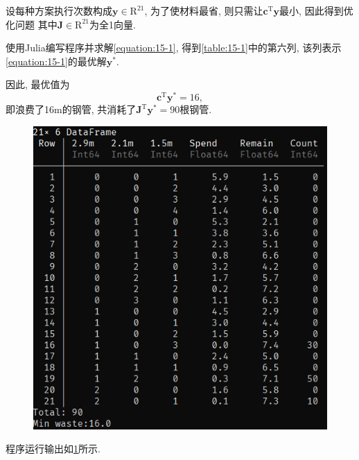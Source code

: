 设每种方案执行次数构成$\bm{y}\in\mathrm{R}^{21}$, 为了使材料最省, 则只需让$\bm{c}^\mathrm{T}\bm{y}$最小, 因此得到优化问题
其中$\bm{J}\in\mathrm{R}^{21}$为全1向量.

使用Julia编写程序并求解\cref{equation:15-1}, 得到\cref{table:15-1}中的第六列, 该列表示\cref{equation:15-1}的最优解$\bm{y}^*$.

因此, 最优值为
\begin{equation*}
    \bm{c}^\mathrm{T}\bm{y}^*=16,
\end{equation*}
即浪费了16m的钢管, 共消耗了$\bm{J}^\mathrm{T}\bm{y}^*=90$根钢管.

\begin{figure}[ht]
    \centering
    \includegraphics[scale=0.6]{figures/15-1.png}
    \caption{}
    \label{figure:15-1}
\end{figure}

程序运行输出如\cref{figure:15-1}所示.
